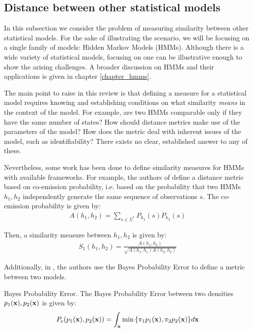 \documentclass[../main.tex]{subfiles} \label{chapter_soa}
\begin{document}
\subsection{Distance between other statistical models}\label{subsection_models}
In this subsection we consider the problem of measuring similarity between other statistical models. For the sake of illustrating the scenario, we will be focusing on a single family of models: Hidden Markov Models (HMMs). Although there is a wide variety of statistical models, focusing on one can be illustrative enough to show the arising challenges. A broader discussion on HMMs and their applications is given in chapter \ref{chapter_hmms}.
\par The main point to raise in this review is that defining a measure for a statistical model requires knowing and establishing conditions on what similarity \emph{means} in the context of the model. For example, are two HMMs comparable only if they have the same number of states? How should distance metrics make use of the parameters of the model? How does the metric deal with inherent issues of the model, such as identifiability? There exists no clear, established answer to any of these.
\par Nevertheless, some work has been done to define similarity measures for HMMs with available frameworks. For example, the authors of \cite{Lyngs1999} define a distance metric based on co-emission probability, i.e. based on the probability that two HMMs $h_1, h_2$ independently generate the same sequence of observations $s$. The co-emission probability is given by:
\begin{align*}
A(h_1, h_2) = \sum_{s\in \Sigma^*}P_{h_1}(s)P_{h_2}(s)
\end{align*}
\par Then, a similarity measure between $h_1, h_2$ is given by:
\begin{align*}
S_1(h_1, h_2) = \frac{A(h_1, h_2)}{\sqrt{A(h_1, h_1)A(h_2, h_2)}}
\end{align*}
\par Additionally, in \cite{Bahlmann2001}, the authors use the Bayes Probability Error to define a metric between two models. 
\begin{definition}{Bayes Probability Error.} \label{def_bpe}
The Bayes Probability Error between two densities $p_1(\mathbf{x}), p_2(\mathbf{x})$ is given by:
\begin{align*}
P_e(p_1(\mathbf{x}), p_2(\mathbf{x})) = \int_{\mathbf{x}}\min{\{\pi_1p_1(\mathbf{x}), \pi_2p_2(\mathbf{x})\}}d\mathbf{x}
\end{align*}
\end{definition}
\end{document}
